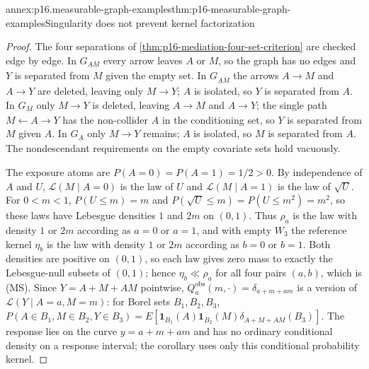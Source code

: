 \begin{annexitem}{annex:p16.measurable-graph-examples}{thm:p16-measurable-graph-examples}{Singularity does not prevent kernel factorization}
\begin{proof}
The four separations of \cref{thm:p16-mediation-four-set-criterion}
are checked edge by edge. In \(G_{\underline A\underline M}\) every
arrow leaves \(A\) or \(M\), so the graph has no edges and \(Y\) is
separated from \(M\) given the empty set. In
\(G_{\underline A\overline M}\) the arrows \(A\to M\) and \(A\to Y\)
are deleted, leaving only \(M\to Y\); \(A\) is isolated, so \(Y\) is
separated from \(A\). In \(G_{\underline M}\) only \(M\to Y\) is
deleted, leaving \(A\to M\) and \(A\to Y\); the single path
\(M\leftarrow A\to Y\) has the non-collider \(A\) in the conditioning
set, so \(Y\) is separated from \(M\) given \(A\). In
\(G_{\underline A}\) only \(M\to Y\) remains; \(A\) is isolated, so
\(M\) is separated from \(A\). The nondescendant requirements on the
empty covariate sets hold vacuously.

The exposure atoms are \(P(A=0)=P(A=1)=1/2>0\). By independence of
\(A\) and \(U\), \(\mathcal L(M\mid A=0)\) is the law of \(U\) and
\(\mathcal L(M\mid A=1)\) is the law of \(\sqrt U\). For \(0<m<1\),
\(P(U\leq m)=m\) and \(P(\sqrt U\leq m)=P(U\leq m^2)=m^2\), so these
laws have Lebesgue densities \(1\) and \(2m\) on \((0,1)\). Thus
\(\rho_a\) is the law with density \(1\) or \(2m\) according as
\(a=0\) or \(a=1\), and with empty \(W_3\) the reference kernel
\(\eta_b\) is the law with density \(1\) or \(2m\) according as
\(b=0\) or \(b=1\). Both densities are positive on \((0,1)\), so each
law gives zero mass to exactly the Lebesgue-null subsets of
\((0,1)\); hence \(\eta_b\ll\rho_a\) for all four pairs \((a,b)\),
which is (MS). Since \(Y=A+M+AM\) pointwise,
\(Q^{\mathrm{obs}}_a(m,\cdot)=\delta_{a+m+am}\) is a version of
\(\mathcal L(Y\mid A=a,M=m)\): for Borel sets \(B_1,B_2,B_3\),
\(P(A\in B_1,M\in B_2,Y\in B_3)=
E[\mathbf1_{B_1}(A)\mathbf1_{B_2}(M)\delta_{A+M+AM}(B_3)]\).
The response lies on the curve \(y=a+m+am\) and has no ordinary
conditional density on a response interval; the corollary uses only
this conditional probability kernel.


\end{proof}
\end{annexitem}
